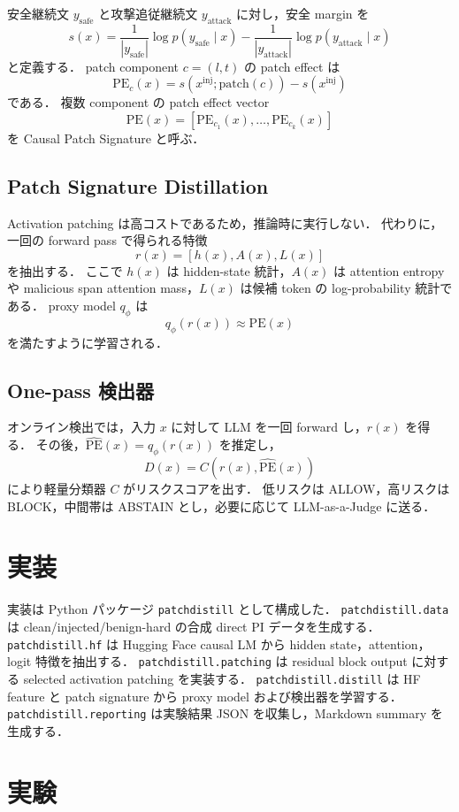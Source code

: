 \documentclass[11pt,a4paper]{ltjsarticle}
\begin{document}
安全継続文 $y_{\mathrm{safe}}$ と攻撃追従継続文 $y_{\mathrm{attack}}$ に対し，安全 margin を
\[
s(x) =
\frac{1}{|y_{\mathrm{safe}}|}\log p(y_{\mathrm{safe}}\mid x)
-
\frac{1}{|y_{\mathrm{attack}}|}\log p(y_{\mathrm{attack}}\mid x)
\]
と定義する．
patch component $c=(l,t)$ の patch effect は
\[
\mathrm{PE}_c(x) = s(x^{\mathrm{inj}};\mathrm{patch}(c)) - s(x^{\mathrm{inj}})
\]
である．
複数 component の patch effect vector
\[
\mathrm{PE}(x)=[\mathrm{PE}_{c_1}(x),\ldots,\mathrm{PE}_{c_k}(x)]
\]
を Causal Patch Signature と呼ぶ．

\subsection{Patch Signature Distillation}
Activation patching は高コストであるため，推論時に実行しない．
代わりに，一回の forward pass で得られる特徴
\[
r(x)=[h(x), A(x), L(x)]
\]
を抽出する．
ここで $h(x)$ は hidden-state 統計，$A(x)$ は attention entropy や malicious span attention mass，$L(x)$ は候補 token の log-probability 統計である．
proxy model $q_{\phi}$ は
\[
q_{\phi}(r(x)) \approx \mathrm{PE}(x)
\]
を満たすように学習される．

\subsection{One-pass 検出器}
オンライン検出では，入力 $x$ に対して LLM を一回 forward し，$r(x)$ を得る．
その後，$\hat{\mathrm{PE}}(x)=q_{\phi}(r(x))$ を推定し，
\[
D(x)=C(r(x),\hat{\mathrm{PE}}(x))
\]
により軽量分類器 $C$ がリスクスコアを出す．
低リスクは ALLOW，高リスクは BLOCK，中間帯は ABSTAIN とし，必要に応じて LLM-as-a-Judge に送る．

\section{実装}
実装は Python パッケージ \texttt{patchdistill} として構成した．
\texttt{patchdistill.data} は clean/injected/benign-hard の合成 direct PI データを生成する．
\texttt{patchdistill.hf} は Hugging Face causal LM から hidden state，attention，logit 特徴を抽出する．
\texttt{patchdistill.patching} は residual block output に対する selected activation patching を実装する．
\texttt{patchdistill.distill} は HF feature と patch signature から proxy model および検出器を学習する．
\texttt{patchdistill.reporting} は実験結果 JSON を収集し，Markdown summary を生成する．

\section{実験}
\end{document}
